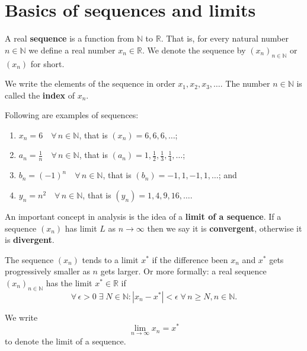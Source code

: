 \chapter{Basics of sequences and limits}

\begin{definition}
    A real \textbf{sequence} is a function from $\mathbb N$ to $\mathbb R$. That is, for every natural number $n\in\mathbb N$ we define a real number $x_n\in\mathbb R$. We denote the sequence by $(x_n)_{n\in\mathbb N}$ or $(x_n)$ for short.
    
    We write the elements of the sequence in order $x_1,x_2,x_3,\ldots$. The number $n\in\mathbb N$ is called the \textbf{index} of $x_n$.
\end{definition}

\begin{example}\label{exa:simple_sequences}
    Following are examples of sequences:
    \begin{enumerate}
        \item $x_n=6\quad\forall\,n\in\mathbb N$, that is $(x_n)=6,6,6,\ldots$;
        \item $a_n=\frac1n\quad\forall\,n\in\mathbb N$, that is $(a_n)=1,\frac12,\frac13,\frac14,\ldots$;
        \item $b_n=(-1)^n\quad\forall\,n\in\mathbb N$, that is $(b_n)=-1,1,-1,1,\ldots$; and
        \item $y_n=n^2\quad\forall\,n\in\mathbb N$, that is $(y_n)=1,4,9,16,\ldots$.
    \end{enumerate}
\end{example}

\begin{definition}
    An important concept in analysis is the idea of a \textbf{limit of a sequence}. If a sequence $(x_n)$ has limit $L$ as $n\to\infty$ then we say it is \textbf{convergent}, otherwise it is \textbf{divergent}.
    
    The sequence $(x_n)$ tends to a limit $x^*$ if the difference been $x_n$ and $x^*$ gets progressively smaller as $n$ gets larger. Or more formally: a real sequence $(x_n)_{n\in\mathbb N}$ has the limit $x^*\in\mathbb R$ if \[\forall\,\epsilon>0\;\exists\;N\in\mathbb N:|x_n-x^*|<\epsilon\;\forall\,n\geq N,n\in\mathbb N.\]
    
    We write \[\lim_{n\to\infty}{x_n}=x^*\] to denote the limit of a sequence.
\end{definition}



